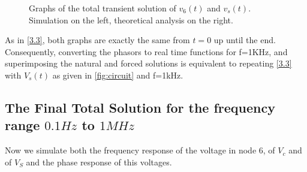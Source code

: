 \begin{figure}[h]
  \caption{\small Graphs of the total transient solution of $v_6(t)$ and $v_s(t)$. Simulation on the left, theoretical analysis on the right.}
  \label{maquina}
\end{figure}

As in \ref{3.3}, both graphs are exactly the same from $t=0$ up until the end. Consequently, converting the phasors to real time functions
for f=1KHz, and superimposing the natural and forced solutions is equivalent to repeating \ref{3.3} with $V_s(t)$ as given in \ref{fig:circuit} and f=1kHz.


\subsection{The Final Total Solution for the frequency range $0.1Hz$ to $1MHz$}


Now we simulate both the frequency response of the voltage in node 6, of $V_c$ and of $V_S$ and the phase response of this voltages.

